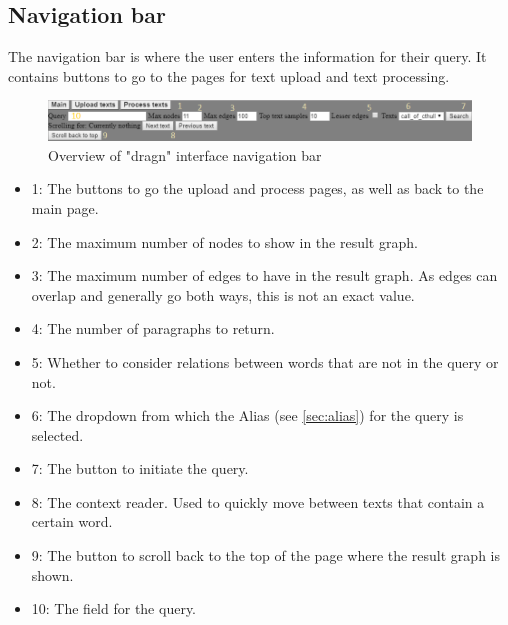 \subsection{Navigation bar}
\label{subsec:navbar}
The navigation bar is where the user enters the information for their query. It contains buttons to go to the pages for text upload and text processing.
\begin{figure}[H]
    \centering
    \hspace*{-1,5cm}
    \includegraphics[scale=0.8]{fig/search-interface}
    \caption{Overview of "dragn" interface navigation bar}
    \label{fig:navbar}
\end{figure}
\begin{itemize}
    \item 1: The buttons to go the upload and process pages, as well as back to the main page.
    \item 2: The maximum number of nodes to show in the result graph.
    \item 3: The maximum number of edges to have in the result graph. As edges can overlap and generally go both ways, this is not an exact value.
    \item 4: The number of paragraphs to return.
    \item 5: Whether to consider relations between words that are not in the query or not.
    \item 6: The dropdown from which the Alias (see \ref{sec:alias}) for the query is selected.
    \item 7: The button to initiate the query.
    \item 8: The context reader. Used to quickly move between texts that contain a certain word.
    \item 9: The button to scroll back to the top of the page where the result graph is shown.
    \item 10: The field for the query.
\end{itemize}


